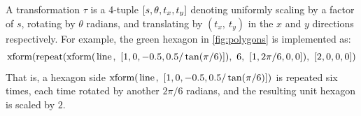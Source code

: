 
A transformation $\tau$ is a 4-tuple
  $[s, \theta, t_x, t_y]$ denoting
  uniformly scaling by a factor of $s$,
  rotating by $\theta$ radians, and
  translating by $(t_x,\ t_y)$ in the
  $x$ and $y$ directions respectively.
For example, the green hexagon in \autoref{fig:polygons} is implemented as:
%
\[
  \xform{
    \rep{
      \xform{
        \T{line}
      }{
        \xargs{1}{0}{-0.5}{0.5 / \tan(\pi / 6)}
      }
    }{6}{
      \xargs{1}{2\pi/6}{0}{0}
    }
  }{
    \xargs{2}{0}{0}{0}
  }
\]
%
That is, a hexagon side $\xform{\T{line}}{\xargs{1}{0}{-0.5}{0.5 / \tan(\pi / 6)}}$
is repeated six times, each time rotated by another $2\pi/6$ radians,
and the resulting unit hexagon is scaled by $2$.



